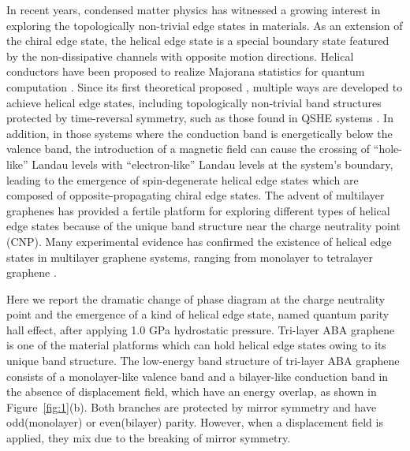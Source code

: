 In recent years, condensed matter physics has witnessed a growing interest in exploring the topologically non-trivial edge states in materials. 
As an extension of the chiral edge state, the helical edge state is a special boundary state featured by the non-dissipative channels with opposite motion directions. 
Helical conductors have been proposed to realize Majorana statistics for quantum computation \cite{qi2011topological, hasan2010colloquium, oreg2010helical, lutchyn2010majorana}.
Since its first theoretical proposed \cite{kane2005quantum, kane2005z}, multiple ways are developed to achieve helical edge states, 
including topologically non-trivial band structures protected by time-reversal symmetry, such as those found in QSHE systems \cite{bernevig2006quantum, roth2009nonlocal}. 
In addition, in those systems where the conduction band is energetically below the valence band, the introduction of a magnetic field can cause the crossing of “hole-like” Landau levels with “electron-like” Landau levels at the system's boundary, 
leading to the emergence of spin-degenerate helical edge states which are composed of opposite-propagating chiral edge states.
The advent of multilayer graphenes has provided a fertile platform for exploring different types of helical edge states 
because of the unique band structure near the charge neutrality point (CNP). 
Many experimental evidence has confirmed the existence of helical edge states in multilayer graphene systems, ranging from monolayer to tetralayer graphene
\cite{veyrat2020helical, young2014tunable, maher2013evidence, stepanov2019quantum, che2020helical}.

Here we report the dramatic change of phase diagram at the charge neutrality point and the emergence of a kind of helical edge state, named quantum parity hall effect, after applying 1.0 GPa hydrostatic pressure.
Tri-layer ABA graphene is one of the material platforms which can hold helical edge states owing to its unique band structure.
The low-energy band structure of tri-layer ABA graphene consists of a monolayer-like valence band and a bilayer-like conduction band in the absence of displacement field, which have an energy overlap, as shown in Figure~\ref{fig:1}(b). 
Both branches are protected by mirror symmetry and have odd(monolayer) or even(bilayer) parity. However, when a displacement field is applied, they mix due to the breaking of mirror symmetry.